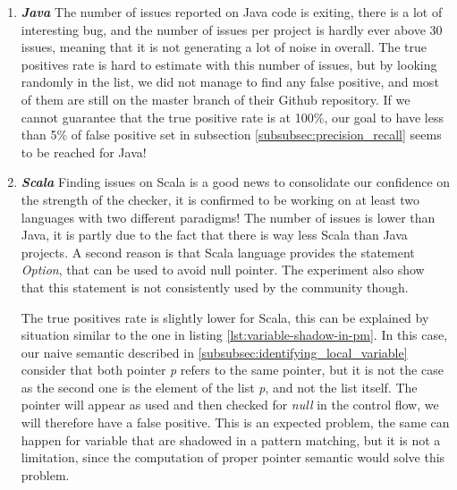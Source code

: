 \begin{enumerate}
	\item \textbf{\textit{Java}} \newline
	The number of issues reported on Java code is exiting, there is a lot of interesting bug, and the number of issues per project is hardly ever above 30 issues, meaning that it is not generating a lot of noise in overall.
	The true positives rate is hard to estimate with this number of issues, but by looking randomly in the list, we did not manage to find any false positive, and most of them are still on the master branch of their Github repository. 
	If we cannot guarantee that the true positive rate is at 100\%, our goal to have less than 5\% of false positive set in subsection \ref{subsubsec:precision_recall} seems to be reached for Java!
    \newline
	\item \textbf{\textit{Scala}} \newline
	Finding issues on Scala is a good news to consolidate our confidence on the strength of the checker, it is confirmed to be working on at least two languages with two different paradigms!
	The number of issues is lower than Java, it is partly due to the fact that there is way less Scala than Java projects.
	A second reason is that Scala language provides the statement \emph{Option}, that can be used to avoid null pointer.
	The experiment also show that this statement is not consistently used by the community though.
	
	
	
	The true positives rate is slightly lower for Scala, this can be explained by situation similar to the one in listing \ref{lst:variable-shadow-in-pm}. 
	In this case, our naive semantic described in \ref{subsubsec:identifying_local_variable} consider that both pointer \emph{p} refers to the same pointer, but it is not the case as the second one is the element of the list \emph{p}, and not the list itself.
	The pointer will appear as used and then checked for \emph{null} in the control flow, we will therefore have a false positive.
	This is an expected problem, the same can happen for variable that are shadowed in a pattern matching, but it is not a limitation, since the computation of proper pointer semantic would solve this problem.
	

\end{enumerate}
